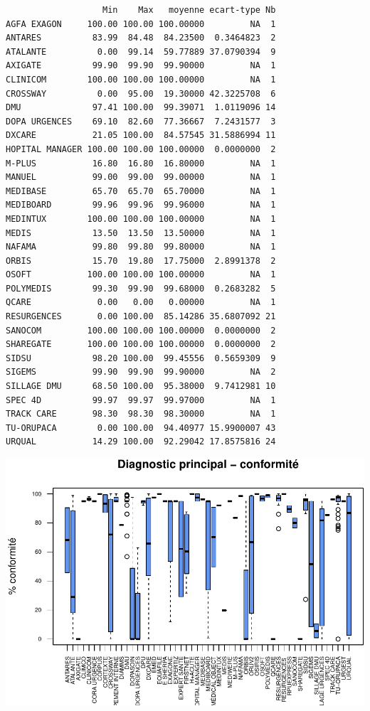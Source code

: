 \documentclass[]{article}
\begin{document}
\begin{verbatim}
                   Min    Max   moyenne ecart-type Nb
AGFA EXAGON     100.00 100.00 100.00000         NA  1
ANTARES          83.99  84.48  84.23500  0.3464823  2
ATALANTE          0.00  99.14  59.77889 37.0790394  9
AXIGATE          99.90  99.90  99.90000         NA  1
CLINICOM        100.00 100.00 100.00000         NA  1
CROSSWAY          0.00  95.00  19.30000 42.3225708  6
DMU              97.41 100.00  99.39071  1.0119096 14
DOPA URGENCES    69.10  82.60  77.36667  7.2431577  3
DXCARE           21.05 100.00  84.57545 31.5886994 11
HOPITAL MANAGER 100.00 100.00 100.00000  0.0000000  2
M-PLUS           16.80  16.80  16.80000         NA  1
MANUEL           99.00  99.00  99.00000         NA  1
MEDIBASE         65.70  65.70  65.70000         NA  1
MEDIBOARD        99.96  99.96  99.96000         NA  1
MEDINTUX        100.00 100.00 100.00000         NA  1
MEDIS            13.50  13.50  13.50000         NA  1
NAFAMA           99.80  99.80  99.80000         NA  1
ORBIS            15.70  19.80  17.75000  2.8991378  2
OSOFT           100.00 100.00 100.00000         NA  1
POLYMEDIS        99.30  99.90  99.68000  0.2683282  5
QCARE             0.00   0.00   0.00000         NA  1
RESURGENCES       0.00 100.00  85.14286 35.6807092 21
SANOCOM         100.00 100.00 100.00000  0.0000000  2
SHAREGATE       100.00 100.00 100.00000  0.0000000  2
SIDSU            98.20 100.00  99.45556  0.5659309  9
SIGEMS           99.90  99.90  99.90000         NA  2
SILLAGE DMU      68.50 100.00  95.38000  9.7412981 10
SPEC 4D          99.97  99.97  99.97000         NA  1
TRACK CARE       98.30  98.30  98.30000         NA  1
TU-ORUPACA        0.00 100.00  94.40977 15.9900007 43
URQUAL           14.29 100.00  92.29042 17.8575816 24
\end{verbatim}

\includegraphics{septembre2015_files/figure-latex/unnamed-chunk-21-1.pdf}
\end{document}

